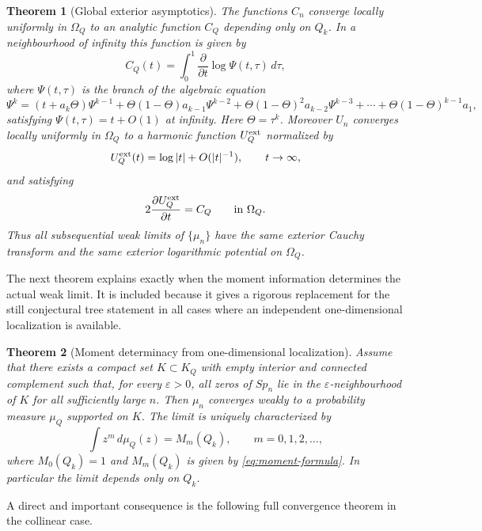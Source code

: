 \documentclass[10pt,twoside,a4paper,reqno]{amsart}
\theoremstyle{plain}
\newtheorem{theo}           {Theorem}
\theoremstyle{definition}
\theoremstyle{remark}
\newenvironment{theorem}{\begin{theo}}{\end{theo}}
\begin{document}
\begin{theorem}[Global exterior asymptotics]\label{th:2}
The functions $C_n$ converge locally uniformly in $\Omega_Q$ to an analytic
function $C_Q$ depending only on $Q_k$.  In a neighbourhood of infinity this
function is given by
\begin{equation}\label{eq:Cauchy-nu}
        C_Q(t)=\int_0^1 \frac{\partial}{\partial t}\log \Psi(t,\tau)\,d\tau,
\end{equation}
where $\Psi(t,\tau)$ is the branch 
of the algebraic equation
\begin{equation}\label{eq:rel-intro}
\Psi^k=(t+a_k\Theta)\Psi^{k-1}
+\Theta(1-\Theta)a_{k-1}\Psi^{k-2}
+\Theta(1-\Theta)^2a_{k-2}\Psi^{k-3}
+\cdots+
\Theta(1-\Theta)^{k-1}a_1,
\end{equation} 
satisfying $\Psi(t,\tau)=t+O(1)$ at infinity. Here  $\Theta=\tau^k$.  Moreover $U_n$ converges locally uniformly in $\Omega_Q$
to a harmonic function $U_Q^{\rm ext}$ normalized by
\[
        U_Q^{\rm ext}(t)=\log|t|+O(|t|^{-1}),\qquad t\to\infty,
\]
and satisfying
\[
        2\frac{\partial U_Q^{\rm ext}}{\partial t}=C_Q
        \qquad \text{in }\Omega_Q .
\]
Thus all subsequential weak limits of $\{\mu_n\}$ have the same exterior Cauchy
transform and the same exterior logarithmic potential on $\Omega_Q$.
\end{theorem}

The next theorem explains exactly when the moment information determines the
actual weak limit.  It is included because it gives a rigorous replacement for
the still conjectural tree statement in all cases where an independent
one-dimensional localization is available.

\begin{theorem}[Moment determinacy from one-dimensional localization]
\label{th:determinacy}
Assume that there exists a compact set $K\subset K_Q$ with empty interior and
connected complement such that, for every $\varepsilon>0$, all zeros of $Sp_n$
lie in the $\varepsilon$-neighbourhood of $K$ for all sufficiently large $n$.
Then $\mu_n$ converges weakly to a probability measure $\mu_Q$ supported on $K$.
The limit is uniquely characterized by
\[
        \int z^m\,d\mu_Q(z)=M_m(Q_k),\qquad m=0,1,2,\ldots,
\]
where $M_0(Q_k)=1$ and $M_m(Q_k)$ is given by \eqref{eq:moment-formula}.  In
particular the limit depends only on $Q_k$.
\end{theorem}

A direct and important consequence is the following full convergence theorem in
the collinear case.
\end{document}
